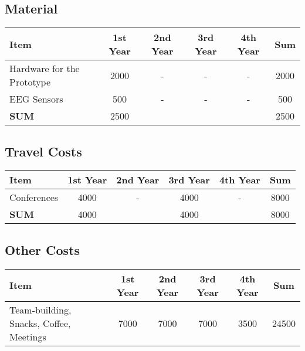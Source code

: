 \subsection{Material}
\begin{tabular}{|l|c|c|c|c|c|}
\hline 
Item & 1st Year & 2nd Year & 3rd Year & 4th Year & Sum \\ 
\hline 
Hardware for the Prototype & 2000 & - & - & - & 2000 \\ 
\hline 
EEG Sensors & 500 & - & - & - & 500 \\ 
\hline 
\textbf{SUM} & 2500 &  &  &  & 2500 \\ 
\hline 
\end{tabular} 

\subsection{Travel Costs}
\begin{tabular}{|l|c|c|c|c|c|}
\hline 
Item & 1st Year & 2nd Year & 3rd Year & 4th Year & Sum \\ 
\hline 
Conferences & 4000 & - & 4000 & - & 8000 \\ 
\hline 
\textbf{SUM} & 4000 &  & 4000 &  & 8000 \\ 
\hline 
\end{tabular} 

\subsection{Other Costs}
\begin{tabular}{|l|c|c|c|c|c|}
\hline 
Item & 1st Year & 2nd Year & 3rd Year & 4th Year & Sum \\ 
\hline 
Team-building, Snacks, Coffee, Meetings & 7000 & 7000 & 7000 & 3500 & 24500 \\
\hline 
\end{tabular} 

